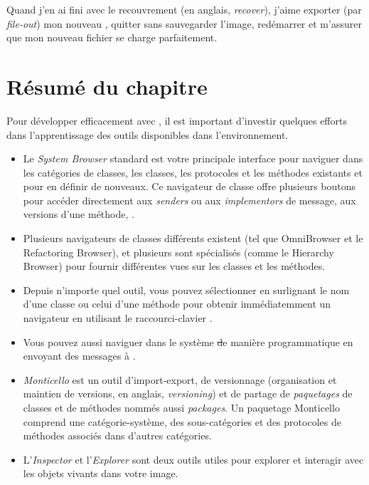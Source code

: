 \documentclass[a4paper,10pt,twoside]{book}
\begin{document}
Quand j'en ai fini avec le recouvrement (en anglais, \emph{recover}), 
j'aime exporter (par \emph{file-out}) mon nouveau \changeset, quitter \sq
sans sauvegarder l'image, red\'emarrer et m'assurer que mon nouveau fichier
se charge parfaitement.

\section{R\'esum\'e du chapitre}

Pour d\'evelopper efficacement avec \sq, il est
important d'investir quelques efforts dans l'apprentissage des outils
disponibles dans l'environnement.

\begin{itemize}
  \item Le \emph{System Browser} standard est votre principale interface pour naviguer dans les cat\'egories de classes, les classes, les protocoles et les m\'ethodes existants et pour en d\'efinir de nouveaux.
Ce navigateur de classe offre plusieurs boutons pour acc\'eder directement aux \emph{senders} ou aux \emph{implementors} de message, aux versions d'une m\'ethode, 
\etc.
  \item Plusieurs navigateurs de classes diff\'erents existent
(tel que OmniBrowser et le Refactoring Browser), et plusieurs sont sp\'ecialis\'es (comme le Hierarchy Browser) pour fournir diff\'erentes vues sur les classes et les m\'ethodes.
  \item Depuis n'importe quel outil, vous pouvez s\'electionner en surlignant le nom d'une classe ou celui d'une m\'ethode pour obtenir imm\'ediatemment
un navigateur en utilisant le raccourci-clavier .
  \item Vous pouvez aussi naviguer dans le syst\`eme \st de mani\`ere
programmatique en envoyant des messages \`a .
  \item \emph{Monticello} est un outil d'import-export, de versionnage
    (organisation et maintien de versions, en anglais, \emph{versioning}) et de partage de \emph{paquetages} de classes et de m\'ethodes nomm\'es aussi \emph{packages}.
  Un paquetage Monticello comprend une cat\'egorie-syst\`eme, des sous-cat\'egories et des protocoles de m\'ethodes associ\'es dans d'autres cat\'egories. 
  \item L'\emph{Inspector} et l'\emph{Explorer} sont deux outils utiles
pour explorer et interagir avec les objets vivants dans votre image.

\end{itemize}
\end{document}
